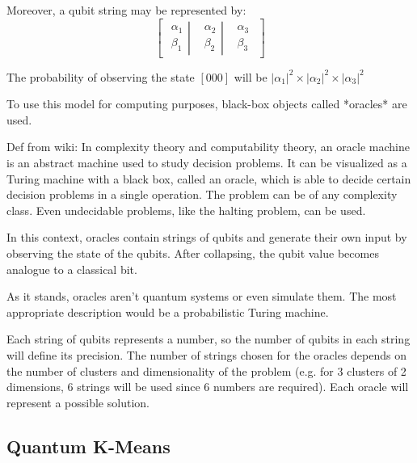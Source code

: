 \documentclass[10pt,a4paper,final]{article}
\begin{document}
Moreover, a qubit string may be represented by:
$$
\begin{bmatrix}
\left.\begin{matrix}
\alpha_1\\ 
\beta_1
\end{matrix}\right| & \left.\begin{matrix}
\alpha_2\\ 
\beta_2
\end{matrix}\right| & \begin{matrix}
\alpha_3\\ 
\beta_3
\end{matrix}
\end{bmatrix}
$$

The probability of observing the state $[000]$ will be $|\alpha_1|^2 \times |\alpha_2|^2 \times |\alpha_3|^2$

To use this model for computing purposes, black-box objects called *oracles* are used.


Def from wiki: In complexity theory and computability theory, an oracle machine is an abstract machine used to study decision problems. It can be visualized as a Turing machine with a black box, called an oracle, which is able to decide certain decision problems in a single operation. The problem can be of any complexity class. Even undecidable problems, like the halting problem, can be used. %

In this context, oracles contain strings of qubits and generate their own input by observing the state of the qubits. After collapsing, the qubit value becomes analogue to a classical bit.

As it stands, oracles aren't quantum systems or even simulate them. The most appropriate description would be a probabilistic Turing machine.

Each string of qubits represents a number, so the number of qubits in each string will define its precision. The number of strings chosen for the oracles depends on the number of clusters and dimensionality of the problem (e.g. for 3 clusters of 2 dimensions, 6 strings will be used since 6 numbers are required). Each oracle will represent a possible solution.


\subsection{Quantum K-Means}
\end{document}

